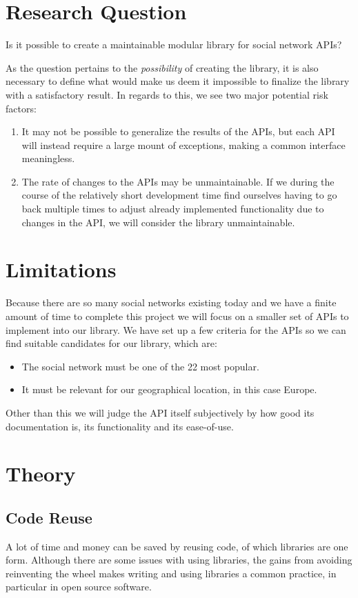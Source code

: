 \documentclass{sigchi-alternate}
\begin{document}
\section{Research Question}
Is it possible to create a maintainable modular library for social network APIs?

As the question pertains to the \textit{possibility} of creating the library, it is also necessary to define what would make us deem it impossible to finalize
the library with a satisfactory result. In regards to this, we see two major potential risk factors:
\begin{enumerate}
	\item It may not be possible to generalize the results of the APIs, but each API will instead require a large mount of exceptions, making a common interface meaningless.
	\item The rate of changes to the APIs may be unmaintainable. If we during the course of the relatively short development time find ourselves having to go back multiple
	times to adjust already implemented functionality due to changes in the API, we will consider the library unmaintainable.
\end{enumerate}
\section{Limitations}
Because there are so many social networks existing today and we have a finite amount of time to complete this
project we will focus on a smaller set of APIs to implement into our library.  We have set up a few criteria 
for the APIs so we can find suitable candidates for our library, which are:
\begin{itemize}
	\item The social network must be one of the 22 most popular\autocite{STATISTA_LEADING_SOCIAL_NETWORKS}.
	\item It must be relevant for our geographical location, in this case Europe.
\end{itemize}
Other than this we will judge the API itself subjectively by how good its documentation is, its functionality and its ease-of-use. 

\section{Theory}
\subsection{Code Reuse}
A lot of time and money can be saved by reusing code, of which libraries are one form. Although there are
some issues with using libraries, the gains from avoiding reinventing the wheel makes writing and using
libraries a common practice, in particular in open source software\autocite{2998479020080101}.
\end{document}
